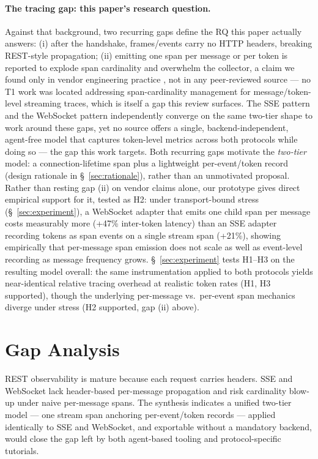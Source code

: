 \documentclass[11pt]{article}
\begin{document}
\paragraph{The tracing gap: this paper's research question.} Against that background, two recurring gaps define the RQ this paper actually answers: (i) after the handshake, frames/events carry no HTTP headers, breaking REST-style propagation; (ii) emitting one span per message or per token is reported to explode span cardinality and overwhelm the collector, a claim we found only in vendor engineering practice \cite{oneuptimews2026}, not in any peer-reviewed source --- no T1 work was located addressing span-cardinality management for message/token-level streaming traces, which is itself a gap this review surfaces. The SSE pattern \cite{oneuptimesse2026} and the WebSocket pattern \cite{oneuptimews2026,alibabaws2026} independently converge on the same two-tier shape to work around these gaps, yet no source offers a single, backend-independent, agent-free model that captures token-level metrics across both protocols while doing so --- the gap this work targets. Both recurring gaps motivate the \emph{two-tier} model: a connection-lifetime span plus a lightweight per-event/token record (design rationale in \S~\ref{sec:rationale}), rather than an unmotivated proposal. Rather than resting gap (ii) on vendor claims alone, our prototype gives direct empirical support for it, tested as H2: under transport-bound stress (\S~\ref{sec:experiment}), a WebSocket adapter that emits one child span per message costs measurably more (+47\% inter-token latency) than an SSE adapter recording tokens as span events on a single stream span (+21\%), showing empirically that per-message span emission does not scale as well as event-level recording as message frequency grows. \S~\ref{sec:experiment} tests H1--H3 on the resulting model overall: the same instrumentation applied to both protocols yields near-identical relative tracing overhead at realistic token rates (H1, H3 supported), though the underlying per-message vs.\ per-event span mechanics diverge under stress (H2 supported, gap (ii) above).

\section{Gap Analysis}
REST observability is mature because each request carries headers. SSE and WebSocket lack header-based per-message propagation and risk cardinality blow-up under naive per-message spans. The synthesis indicates a unified two-tier model --- one stream span anchoring per-event/token records --- applied identically to SSE and WebSocket, and exportable without a mandatory backend, would close the gap left by both agent-based tooling and protocol-specific tutorials.
\end{document}
